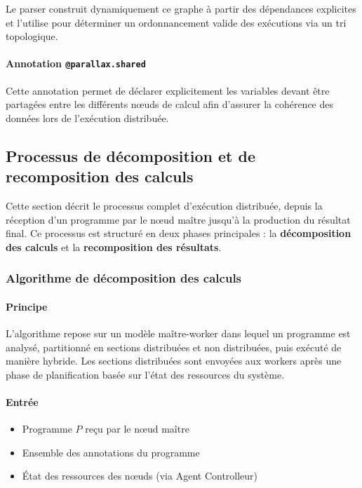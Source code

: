 \documentclass[12pt,a4paper]{report}
\theoremstyle{definition}
\begin{document}
Le parser construit dynamiquement ce graphe à partir des dépendances explicites et l'utilise pour déterminer un ordonnancement valide des exécutions via un tri topologique.


\paragraph{Annotation \texttt{@parallax.shared}}

Cette annotation permet de déclarer explicitement les variables devant être partagées entre les différents nœuds de calcul afin d'assurer la cohérence des données lors de l'exécution distribuée.

\subsection{Processus de décomposition et de recomposition des calculs}

Cette section décrit le processus complet d’exécution distribuée, depuis la réception d’un programme par le nœud maître jusqu’à la production du résultat final. Ce processus est structuré en deux phases principales : la \textbf{décomposition des calculs} et la \textbf{recomposition des résultats}.

\subsubsection{Algorithme de décomposition des calculs}

\paragraph{Principe}
L’algorithme repose sur un modèle maître-worker dans lequel un programme est analysé, partitionné en sections distribuées et non distribuées, puis exécuté de manière hybride. Les sections distribuées sont envoyées aux workers après une phase de planification basée sur l’état des ressources du système.

\paragraph{Entrée}
\begin{itemize}
    \item[$\bullet$] Programme $P$ reçu par le nœud maître
    \item[$\bullet$] Ensemble des annotations du programme
    \item[$\bullet$] État des ressources des nœuds (via Agent Controlleur)
\end{itemize}
\end{document}
